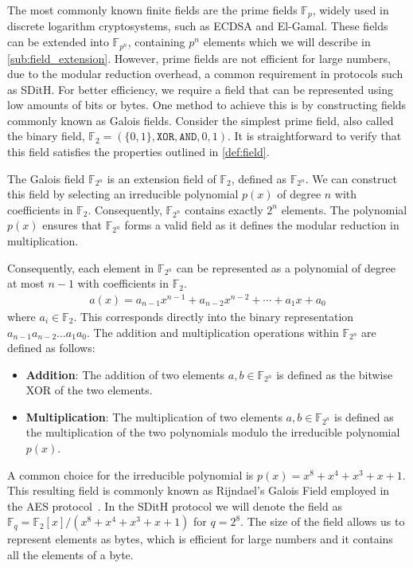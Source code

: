 \documentclass[11pt]{report}
\theoremstyle{definition}
\theoremstyle{plain}
\begin{document}
\noindent
The most commonly known finite fields are the prime fields $\mathbb{F}_p$, widely used in discrete logarithm cryptosystems, such as ECDSA and El-Gamal. These fields can be extended into $\mathbb{F}_{p^n}$, containing $p^n$ elements which we will describe in \autoref{sub:field_extension}. However, prime fields are not efficient for large numbers, due to the modular reduction overhead, a common requirement in protocols such as SDitH. For better efficiency, we require a field that can be represented using low amounts of bits or bytes. One method to achieve this is by constructing fields commonly known as Galois fields. Consider the simplest prime field, also called the binary field, $\mathbb{F}_2 = (\{0,1\}, \texttt{XOR}, \texttt{AND}, 0, 1)$. It is straightforward to verify that this field satisfies the properties outlined in \autoref{def:field}.

The Galois field $\mathbb{F}_{2^n}$ is an extension field of $\mathbb{F}_2$, defined as $\mathbb{F}_{2^n}$. We can construct this field by selecting an irreducible polynomial $p(x)$ of degree $n$ with coefficients in $\mathbb{F}_2$. Consequently, $\mathbb{F}_{2^n}$ contains exactly $2^n$ elements. The polynomial $p(x)$ ensures that $\mathbb{F}_{2^n}$ forms a valid field as it defines the modular reduction in multiplication.

Consequently, each element in $\mathbb{F}_{2^n}$ can be represented as a polynomial of degree at most $n-1$ with coefficients in $\mathbb{F}_2$.
\begin{align*}
  a(x) = a_{n-1}x^{n-1} + a_{n-2}x^{n-2} + \cdots + a_1x + a_0
\end{align*}
\noindent
where $a_i \in \mathbb{F}_2$. This corresponds directly into the binary representation $a_{n-1}a_{n-2}\dots a_1a_0$. The addition and multiplication operations within $\mathbb{F}_{2^n}$ are defined as follows:

\begin{itemize}
  \item \textbf{Addition}: The addition of two elements $a,b \in \mathbb{F}_{2^n}$ is defined as the bitwise XOR of the two elements.
  \item \textbf{Multiplication}: The multiplication of two elements $a,b \in \mathbb{F}_{2^n}$ is defined as the multiplication of the two polynomials modulo the irreducible polynomial $p(x)$.
\end{itemize}

A common choice for the irreducible polynomial is $p(x) = x^8 + x^4 + x^3 + x + 1$. This resulting field is commonly known as Rijndael's Galois Field employed in the AES protocol~\cite{brownadvanced}. In the SDitH protocol we will denote the field as $\mathbb{F}_{q} = \mathbb{F}_2[x]/(x^8 + x^4 + x^3 + x + 1)$ for $q=2^8$. The size of the field allows us to represent elements as bytes, which is efficient for large numbers and it contains all the elements of a byte.
\end{document}
